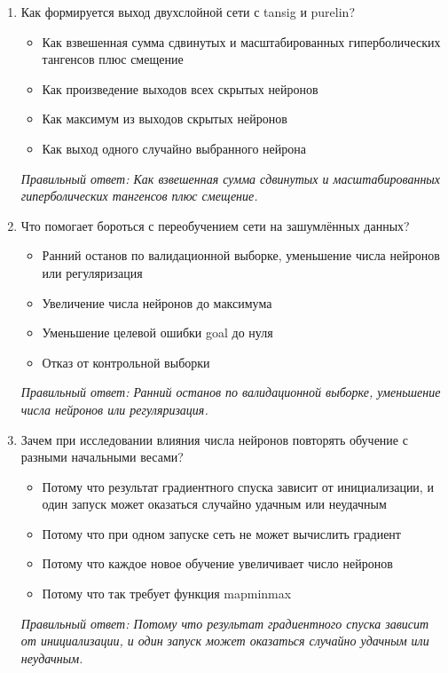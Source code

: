 \begin{enumerate}[label=\textbf{\arabic*.}, leftmargin=0pt, itemsep=1.2em]
\item Как формируется выход двухслойной сети с tansig и purelin?
\begin{itemize}[label=$\square$, leftmargin=1.5cm, itemsep=0.2em, topsep=0.3em]
\item Как взвешенная сумма сдвинутых и масштабированных гиперболических тангенсов плюс смещение
\item Как произведение выходов всех скрытых нейронов
\item Как максимум из выходов скрытых нейронов
\item Как выход одного случайно выбранного нейрона
\end{itemize}
{\small\textit{Правильный ответ: Как взвешенная сумма сдвинутых и масштабированных гиперболических тангенсов плюс смещение.}}

\item Что помогает бороться с переобучением сети на зашумлённых данных?
\begin{itemize}[label=$\square$, leftmargin=1.5cm, itemsep=0.2em, topsep=0.3em]
\item Ранний останов по валидационной выборке, уменьшение числа нейронов или регуляризация
\item Увеличение числа нейронов до максимума
\item Уменьшение целевой ошибки goal до нуля
\item Отказ от контрольной выборки
\end{itemize}
{\small\textit{Правильный ответ: Ранний останов по валидационной выборке, уменьшение числа нейронов или регуляризация.}}

\item Зачем при исследовании влияния числа нейронов повторять обучение с разными начальными весами?
\begin{itemize}[label=$\square$, leftmargin=1.5cm, itemsep=0.2em, topsep=0.3em]
\item Потому что результат градиентного спуска зависит от инициализации, и один запуск может оказаться случайно удачным или неудачным
\item Потому что при одном запуске сеть не может вычислить градиент
\item Потому что каждое новое обучение увеличивает число нейронов
\item Потому что так требует функция mapminmax
\end{itemize}
{\small\textit{Правильный ответ: Потому что результат градиентного спуска зависит от инициализации, и один запуск может оказаться случайно удачным или неудачным.}}

\end{enumerate}
